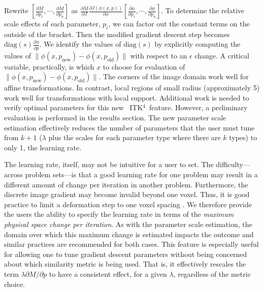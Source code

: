 \documentclass{frontiersSCNS}
\newcommand{\tk}{~ITK$^{\text{4}}$~}
\begin{document}
Rewrite $[ \frac{\partial
  M}{\partial p_1} , \cdots , \frac{\partial
  M}{\partial p_n} 
 ]$ as $\frac{\partial M}{\partial J}\frac{\partial
  J(\phi(x,p))}{\partial \phi} [ \frac{\partial \phi}{\partial p_1} , \cdots , \frac{\partial \phi}{\partial p_n} ]$.
To determine the relative scale effects of each parameter, $p_i$, we
can factor out the constant terms on the outside of the bracket.  
Then the modified gradient descent step becomes
$\text{diag}(s)\frac{\partial \phi}{\partial p}$.  We identify the values
of $\text{diag}(s)$ by explicitly computing the values of $\| \phi(x,p_{\text{new}}) -
\phi(x,p_\text{old}) \| $ with respect to an $\epsilon$ change.  A critical variable,
practically, is which $x$ to choose for evaluation of $\| \phi(x,p_{\text{new}}) -
\phi(x,p_\text{old}) \| $.  The corners of the image domain work well
for affine transformations.  In contrast, local regions of small radius
(approximately 5) work well for transformations with local support.
Additional work is needed to verify optimal parameters for this new
\tk feature.  However, a preliminary evaluation is performed in the results
section.  The new parameter scale estimation effectively reduces the number of parameters
that the user must tune from $k+1$ ($\lambda$ plus the scales for each
parameter type where there are $k$ types) to only 1, the learning
rate.  

The learning rate, itself, may not be intuitive for a user to set.
The difficulty---across problem sets---is that a good learning rate for
one problem may result in a different amount of change per iteration
in another problem.  Furthermore, the discrete image gradient may
become invalid beyond one voxel.  Thus, it is good practice to limit a deformation step to one voxel spacing
\cite{Jenkinson2001}.  We therefore provide the users the ability to
specify the learning rate in terms of the {\em maximum physical space change
  per iteration}.  As with the parameter scale estimation, the domain
over which this maximum change is estimated impacts the outcome and
similar practices are recommended for both cases.   This feature is
especially useful for allowing one to tune gradient descent parameters
without being concerned about which similarity metric is being used.
That is, it effectively rescales the term $\lambda \partial M / \partial p$ to
have a consistent effect, for a given $\lambda$, regardless of the metric choice.
\end{document}
